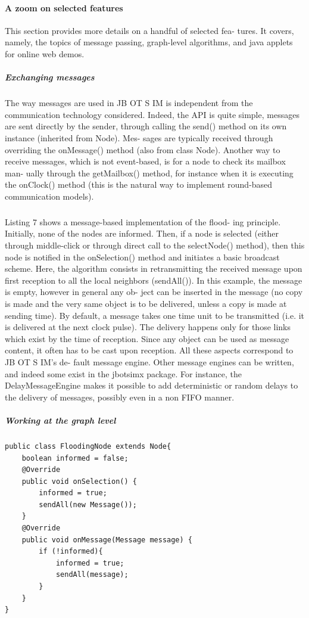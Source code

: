 \paragraph{A zoom on selected features}This section provides more details on a handful of selected fea- tures. It covers, namely, the topics of message passing, graph-level algorithms, and java applets for online web demos.
\subparagraph{Exchanging messages}The way messages are used in JB OT S IM is independent from the communication technology considered. Indeed, the API is quite simple, messages are sent directly by the sender, through calling the send() method on its own instance (inherited from Node). Mes- sages are typically received through overriding the onMessage() method (also from class Node). Another way to receive messages, which is not event-based, is for a node to check its mailbox man- ually through the getMailbox() method, for instance when it is executing the onClock() method (this is the natural way to implement round-based communication models). \subparagraph{}Listing 7 shows a message-based implementation of the flood- ing principle. Initially, none of the nodes are informed. Then, if a node is selected (either through middle-click or through direct call to the selectNode() method), then this node is notified in the onSelection() method and initiates a basic broadcast scheme. Here, the algorithm consists in retransmitting the received message upon first reception to all the local neighbors (sendAll()). In this example, the message is empty, however in general any ob- ject can be inserted in the message (no copy is made and the very same object is to be delivered, unless a copy is made at sending time). By default, a message takes one time unit to be transmitted (i.e. it is delivered at the next clock pulse). The delivery happens only for those links which exist by the time of reception. Since any object can be used as message content, it often has to be cast upon reception. All these aspects correspond to JB OT S IM’s de- fault message engine. Other message engines can be written, and indeed some exist in the jbotsimx package. For instance, the DelayMessageEngine makes it possible to add deterministic or random delays to the delivery of messages, possibly even in a non FIFO manner.
\subparagraph{Working at the graph level}
\begin{lstlisting}[caption=Example of message passing algorithm, captionpos=b]
public class FloodingNode extends Node{
	boolean informed = false;
	@Override 
	public void onSelection() {
		informed = true;
		sendAll(new Message());
	}
	@Override
	public void onMessage(Message message) {
		if (!informed){
			informed = true;
			sendAll(message);
		}
	}
}
\end{lstlisting}
